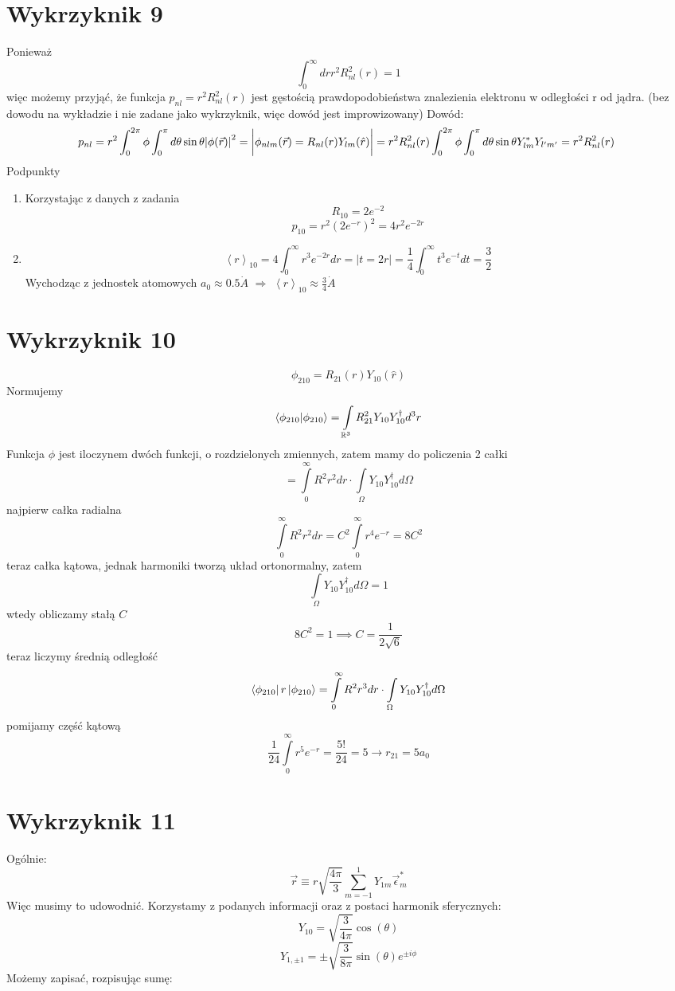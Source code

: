 \documentclass[a4paper,12pt]{article}
\begin{document}
\section{Wykrzyknik 9}
Ponieważ 
\[
  \int_0^\infty dr r^2 R_{nl}^2(r) = 1
\]
więc możemy przyjąć, że funkcja $p_{nl} = r^2R_{nl}^2(r)$ jest gęstością
prawdopodobieństwa znalezienia elektronu w odległości r od jądra. (bez dowodu
na wykładzie i nie zadane jako wykrzyknik, więc dowód jest improwizowany)
Dowód:
\[
  p_{nl} = r^2 \int_0^{2\pi}\phi\int_0^\pi d\theta\sin\theta
  \abs{\phi(\vec{r})}^2 = \bigg\vert \phi_{nlm} (\vec{r}) =
  R_{nl}(r)Y_{lm}(\hat{r}) \bigg\vert =
  r^2R_{nl}^2(r)\int_0^{2\pi}\phi\int_0^\pi d\theta\sin\theta Y^*_{lm} Y_{l'm'}
  = r^2 R_{nl}^2(r)
  \
\]
Podpunkty
\begin{enumerate}[label=(\alph*)]
  \item Korzystając z danych z zadania
    \[
      R_{10} = 2e^{-2}
    \]
    \[
      p_{10} = r^2(2e^{-r})^2 = 4r^2 e^{-2r}
    \]
  \item
    \[
      \left< r \right>_{10} = 4 \int_0^\infty r^3 e^{-2r} dr = \bigg \vert t =
      2r \bigg \vert = \frac{1}{4} \int_0^\infty t^3 e^{-t} dt = \frac{3}{2}
    \]
    Wychodząc z jednostek atomowych $a_0 \approx 0.5 \dot{A}$ $\Rightarrow$
    $\left< r \right>_{10} \approx \frac{3}{4} \dot{A}$
\end{enumerate}
\section{Wykrzyknik 10}
$$
	\phi_{210} = R_{21}(r) Y_{10}(\hat{r})
$$
Normujemy
$$
	\braket{\phi_{210}}{\phi_{210}} = \int\limits_{\mathbb{R}^3} R_{21}^2 Y_{10} Y_{10}^\dagger d^3r
$$
Funkcja $\phi$ jest iloczynem dwóch funkcji, o rozdzielonych zmiennych, zatem mamy do policzenia 2 całki
$$
	= \int\limits_0^{\infty}R^2 r^2 dr \cdot \int\limits_{\Omega} Y_{10} Y_{10}^\dagger d\Omega
$$
najpierw całka radialna
$$
	\int\limits_0^{\infty}R^2 r^2 dr  = C^2\int\limits_0^{\infty}r^4 e^{-r} = 8C^2
$$
teraz całka kątowa, jednak harmoniki tworzą układ ortonormalny, zatem
$$
	\int\limits_{\Omega} Y_{10} Y_{10}^\dagger d\Omega = 1
$$
wtedy obliczamy stałą $C$
$$
	8C^2 = 1 \implies C= \frac{1}{2\sqrt{6}}
$$
teraz liczymy średnią odległość
$$
	\bra{\phi_{210}}r\ket{\phi_{210}} = \int\limits_0^{\infty}R^2 r^3 dr \cdot \int\limits_{\Omega} Y_{10} Y_{10}^\dagger d\Omega
$$
pomijamy część kątową
$$
	\frac{1}{24}\int\limits_0^{\infty}r^5 e^{-r} = \frac{5!}{24} = 5 \to r_{21} = 5a_0
$$

\section{Wykrzyknik 11}
Ogólnie:
\[
  \vec{r} \equiv  r \sqrt{\frac{4\pi}{3}}\sum_{m=-1}^{1} Y_{1m}
  \vec{\epsilon}_m^*
\]
Więc musimy to udowodnić. Korzystamy z podanych informacji oraz z postaci
harmonik sferycznych:
\[
  Y_{10} = \sqrt{\frac{3}{4\pi}} \cos(\theta)
\]
\[
  Y_{1, \pm 1} = \pm \sqrt{\frac{3}{8\pi}} \sin(\theta) e^{\pm i \phi}
\]
Możemy zapisać, rozpisując sumę:
\end{document}
